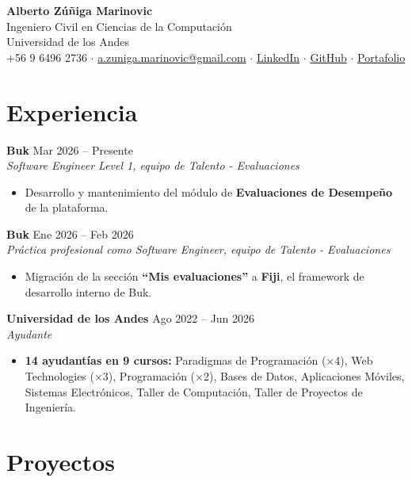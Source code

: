 \documentclass[a4paper,11pt]{article}
\newcommand{\entry}[3]{%
  {\large\textbf{#1}} \hfill {\color{muted}#2} \\
  {\color{accent}\textit{#3}}\par
}
\newcommand{\entrygap}{\vspace{5pt}}
\begin{document}
\begin{center}
  {\huge\bfseries Alberto Zúñiga Marinovic} \\[5pt]
  {\large\color{accent} Ingeniero Civil en Ciencias de la Computación} \\[2pt]
  {\color{muted} Universidad de los Andes} \\[5pt]
  +56 9 6496 2736 \quad$\cdot$\quad
  \href{mailto:a.zuniga.marinovic@gmail.com}{a.zuniga.marinovic@gmail.com} \quad$\cdot$\quad
  \href{https://www.linkedin.com/in/alberto-zuniga-marinovic}{LinkedIn} \quad$\cdot$\quad
  \href{https://github.com/AlbertoZuiga}{GitHub} \quad$\cdot$\quad
  \href{https://albertozuiga.github.io}{Portafolio}
\end{center}

\section*{Experiencia}

\entry{Buk}{Mar 2026 -- Presente}{Software Engineer Level 1, equipo de Talento - Evaluaciones}
\begin{itemize}
  \item Desarrollo y mantenimiento del módulo de \textbf{Evaluaciones de Desempeño} de la plataforma.
\end{itemize}
\entrygap

\entry{Buk}{Ene 2026 -- Feb 2026}{Práctica profesional como Software Engineer, equipo de Talento - Evaluaciones}
\begin{itemize}
  \item Migración de la sección \textbf{``Mis evaluaciones''} a \textbf{Fiji}, el framework de desarrollo interno de Buk.
\end{itemize}
\entrygap

\entry{Universidad de los Andes}{Ago 2022 -- Jun 2026}{Ayudante}
\begin{itemize}
  \item \textbf{14 ayudantías en 9 cursos:} Paradigmas de Programación (×4), Web Technologies (×3), Programación (×2),
        Bases de Datos, Aplicaciones Móviles, Sistemas Electrónicos, Taller de Computación, Taller de Proyectos de Ingeniería.
\end{itemize}

\section*{Proyectos}
\end{document}
